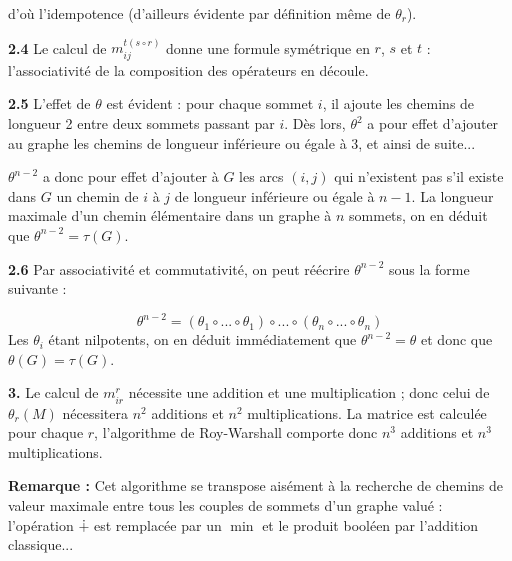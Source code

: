 \documentclass{article}
\begin{document}
d'où l'idempotence (d'ailleurs évidente par définition même de
$\theta_r$).

\textbf{2.4} Le calcul de $m_{ij}^{t(s\circ r)}$ donne une formule
symétrique en $r$, $s$ et $t$ : l'associativité de la composition des
opérateurs en découle.

\textbf{2.5} L'effet de $\theta$ est évident : pour chaque sommet $i$,
il ajoute les chemins de longueur 2 entre deux sommets passant par
$i$. Dès lors, $\theta^2$ a pour effet d'ajouter au graphe les chemins
de longueur inférieure ou égale à 3, et ainsi de suite...

$\theta^{n-2}$ a donc pour effet d'ajouter à $G$ les arcs $(i,j)$ qui
n'existent pas s'il existe dans $G$ un chemin de $i$ à $j$ de longueur
inférieure ou égale à $n-1$. La longueur maximale d'un chemin
élémentaire dans un graphe à $n$ sommets, on en déduit que
$\theta^{n-2}=\tau (G)$.

\textbf{2.6} Par associativité et commutativité, on peut réécrire
$\theta^{n-2}$ sous la forme suivante :

\begin{equation}
  \theta^{n-2} = ( \theta_1 \circ ... \circ \theta_1) \circ ...
  \circ ( \theta_n \circ ... \circ \theta_n)
\end{equation}
 Les $\theta_{i}$ étant nilpotents, on en déduit immédiatement que
 $\theta^{n-2}=\theta$ et donc que $\theta(G) = \tau(G)$.

\textbf{3.} Le calcul de $m_{ir}^r$ nécessite une addition et une
multiplication ; donc celui de $\theta_r(M)$ nécessitera $n^2$
additions et $n^2$ multiplications. La matrice est calculée pour
chaque $r$, l'algorithme de Roy-Warshall comporte donc $n^3$
additions et $n^3$ multiplications.

\textbf{Remarque : } Cet algorithme se transpose aisément à la
recherche de chemins de valeur maximale entre tous les couples de
sommets d'un graphe valué : l'opération $\dotplus$ est remplacée par
un $\min$ et le produit booléen par l'addition classique...
\end{document}
